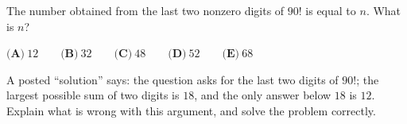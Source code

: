 The number obtained from the last two nonzero digits of $90!$ is equal to $n$. What is $n$?

$\textbf{(A)}\ 12\qquad\textbf{(B)}\ 32\qquad\textbf{(C)}\ 48\qquad\textbf{(D)}\ 52\qquad\textbf{(E)}\ 68$

A posted ``solution'' says: the question asks for the last two digits of $90!$; the largest possible sum of two digits is $18$, and the only answer below $18$ is $12$. Explain what is wrong with this argument, and solve the problem correctly.

